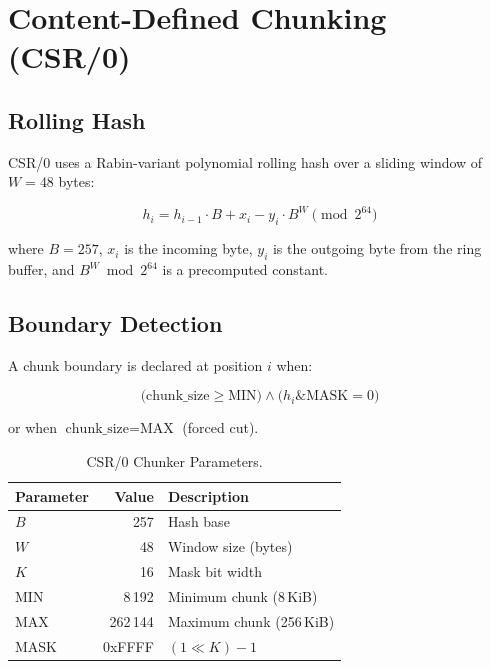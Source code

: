 \documentclass[11pt,twocolumn]{article}
\theoremstyle{definition}
\begin{document}
\section{Content-Defined Chunking (CSR/0)}
\label{sec:cdc}

\subsection{Rolling Hash}

CSR/0 uses a Rabin-variant polynomial rolling hash over a sliding window
of $W = 48$ bytes:

\begin{equation}
  h_i = h_{i-1} \cdot B + x_i - y_i \cdot B^W \pmod{2^{64}}
  \label{eq:rolling-hash}
\end{equation}

where $B = 257$, $x_i$ is the incoming byte, $y_i$ is the outgoing byte
from the ring buffer, and $B^W \bmod 2^{64}$ is a precomputed constant.

\subsection{Boundary Detection}

A chunk boundary is declared at position $i$ when:

\begin{equation}
  \bigl(\text{chunk\_size} \geq \text{MIN}\bigr) \wedge
  \bigl(h_i \mathbin{\&} \text{MASK} = 0\bigr)
  \label{eq:boundary}
\end{equation}

or when $\text{chunk\_size} = \text{MAX}$ (forced cut).

\begin{table}[t]
\centering
\caption{CSR/0 Chunker Parameters.}
\label{tab:cdc-params}
\begin{tabular}{@{}lrl@{}}
\toprule
Parameter & Value & Description \\
\midrule
$B$    & 257      & Hash base \\
$W$    & 48       & Window size (bytes) \\
$K$    & 16       & Mask bit width \\
MIN    & 8\,192   & Minimum chunk (8\,KiB) \\
MAX    & 262\,144 & Maximum chunk (256\,KiB) \\
MASK   & 0xFFFF   & $(1 \ll K) - 1$ \\
\bottomrule
\end{tabular}
\end{table}
\end{document}
